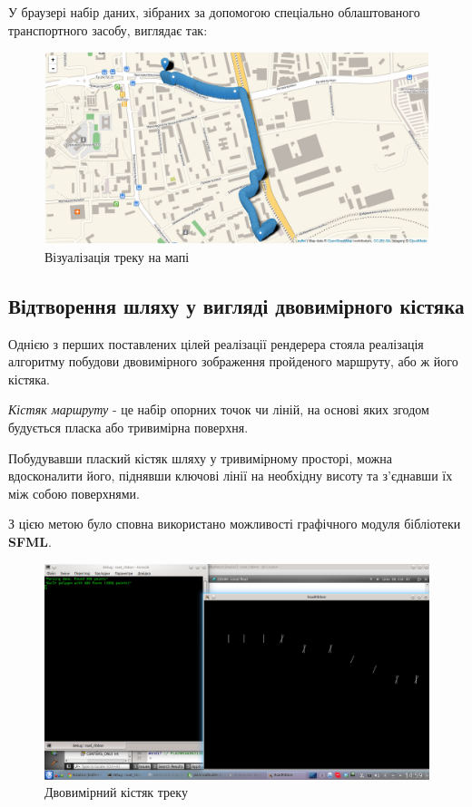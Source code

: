\documentclass[simple,a4paper,14pt,ukrainian,utf8]{eskdtext}
\begin{document}
    У браузері набір даних, зібраних за допомогою спеціально облаштованого транспортного засобу, виглядає так:
    
    \vspace{3em}
    \begin{figure}
	    \centering \includegraphics[scale=0.34]{images/leaflet_renderer.png}
	    \caption{Візуалізація треку на мапі}
	\end{figure}
    
    \newpage
    	
    \subsection{Відтворення шляху у вигляді двовимірного кістяка}
    
    Однією з перших поставлених цілей реалізації рендерера стояла реалізація алгоритму побудови двовимірного зображення пройденого маршруту, або ж його кістяка. 
    
    \textit{Кістяк маршруту} - це набір опорних точок чи ліній, на основі яких згодом будується пласка або тривимірна поверхня.
    
    Побудувавши плаский кістяк шляху у тривимірному просторі, можна вдосконалити його, піднявши ключові лінії на необхідну висоту та з’єднавши їх між собою поверхнями.
    
    З цією метою було сповна використано можливості графічного модуля бібліотеки \textbf{SFML}.
    
    \vspace{3em}  
    \begin{figure}  
	    \centering \includegraphics[scale=0.34]{images/road2d_2.png}
	    \caption{Двовимірний кістяк треку}
	\end{figure}
    
\end{document}
